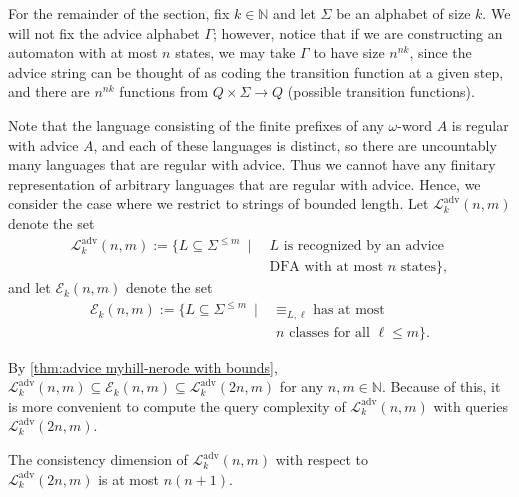 \documentclass[runningheads]{llncs}
\newcommand{\bb}{\mathbb}
\newcommand{\mc}{\mathcal}
\begin{document}
For the remainder of the section, fix $k \in \bb N$ and let $\Sigma$ be an alphabet of size $k$. 
We will not fix the advice alphabet $\Gamma$; however, notice that if we are constructing an automaton with at most $n$ states, we may take $\Gamma$ to have size $n^{nk}$, since the advice string can be thought of as coding the transition function at a given step, and there are $n^{nk}$ functions from $Q \times \Sigma \to Q$ (possible transition functions). 

Note that the language consisting of the finite prefixes of any $\omega$-word $A$ is regular with advice $A$, and each of these languages is distinct, so there are uncountably many languages that are regular with advice.
Thus we cannot have any finitary representation of arbitrary languages that are regular with advice.
Hence, we consider the case where we restrict to strings of bounded length.
Let $\mc L^{\text{adv}}_k(n,m)$ denote the set 
\begin{align*}
    \mc L^{\text{adv}}_k(n,m) := \{L \subseteq \Sigma^{\leq m} \ \mid \ &L \text{ is recognized by an advice} \\
    &\text{DFA with at most } n \text{ states}\},
\end{align*}
and let $\mc E_k(n,m)$ denote the set
\begin{align*}
  \mc E_k(n,m) := \{L \subseteq \Sigma^{\leq m}  \ \mid \ &\equiv_{L,\ell} \text{ has at most } \\
  &n \text{ classes for all } \ell \leq m\}.
\end{align*}

By \autoref{thm:advice myhill-nerode with bounds}, $\mc L^{\text{adv}}_k(n,m) \subseteq \mc E_k(n,m) \subseteq \mc L^{\text{adv}}_k(2n,m)$ for any $n,m \in \bb N$. 
Because of this, it is more convenient to compute the query complexity of $\mc L^{\text{adv}}_k(n,m)$ with queries $\mc L^{\text{adv}}_k(2n,m)$. 

\begin{proposition} \label{prop:Cdim of DFAs with advice}
  The consistency dimension of $\mc L^{\text{adv}}_k(n,m)$ with respect to \\$\mc L^{\text{adv}}_k(2n,m)$ is at most $n(n+1)$.
\end{proposition}
\end{document}
